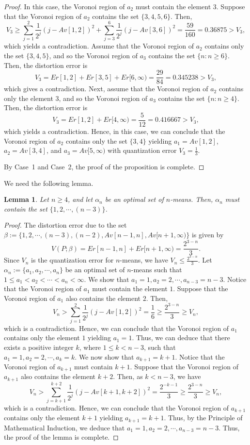 \documentclass[12pt, reqno]{amsart}
\theoremstyle{plain}
\newtheorem{lemma}[subsection]{Lemma}
\theoremstyle{definition}
\newcommand{\set}[1]{\{#1\}}%
\newcommand{\ga}{\alpha}
\newcommand{\gb}{\beta}
\begin{document}
\begin{proof}
In this case, the Voronoi region of $a_2$ must contain the element $3$. Suppose that the Voronoi region of $a_2$ contains the set $\set{3, 4, 5, 6}$. Then,
\[V_3\geq  \sum_{j=1}^2\frac 1 {2^j}(j-Av[1,2])^2+ \sum_{j=3}^6\frac 1 {2^j}(j-Av[3, 6])^2 =\frac{59}{160} =0.36875>V_3,\]
which yields a contradiction. Assume that the Voronoi region of $a_2$ contains only the set $\set{3, 4, 5}$, and so the Voronoi region of $a_3$ contains the set $\set{n : n\geq 6}$. Then, the distortion error is
\[V_3=Er[1,2]+Er[3,5]+Er[6, \infty)=\frac{29}{84} =0.345238>V_3,\]
which gives a contradiction.
Next, assume that the Voronoi region of $a_2$ contains only the element $3$, and so the Voronoi region of $a_3$ contains the set $\set{n : n\geq 4}$. Then, the distortion error is
\[V_3=Er[1,2]+Er[4, \infty)=\frac{5}{12}=0.416667>V_3,\]
which yields a contradiction.
Hence, in this case, we can conclude that the Voronoi region of $a_2$ contains only the set $\set{3,4}$ yielding $a_1=Av[1,2]$, $a_2=Av[3,4]$, and $a_3=Av[5, \infty)$ with quantization error $V_3=\frac 13$.

By Case~1 and Case~2, the proof of the proposition is complete.
\end{proof}

We need the following lemma.

\begin{lemma} \label{lemma1}
Let $n\geq 4$, and let $\ga_n$ be an optimal set of $n$-means. Then, $\ga_n$ must contain the set $\set{1, 2, \cdots, (n-3)}$.
\end{lemma}
\begin{proof}
The distortion error due to the set $\gb:=\set{1, 2, \cdots, (n-3), (n-2), Av[n-1, n], Av[n+1, \infty)}$ is given by
\[V(P; \gb)=Er[n-1, n]+Er[n+1, \infty)=\frac{2^{3-n}}{3}.\]
Since $V_n$ is the quantization error for $n$-means, we have $V_n\leq \frac{2^{3-n}}{3}$.
Let $\ga_n:=\set{a_1, a_2, \cdots, a_n}$ be an optimal set of $n$-means such that $1\leq a_1<a_2<\cdots<a_n<\infty$. We show that $a_1=1, a_2=2, \cdots, a_{n-3}=n-3$.
Notice that the Voronoi region of $a_1$ must contain the element $1$. Suppose that the Voronoi region of $a_1$ also contains the element $2$. Then,
\[V_n>\sum_{j=1}^2\frac 1 {2^j}(j-Av[1,2])^2=\frac{1}{6}\geq \frac{2^{3-n}}{3} \geq V_n,\]
which is a contradiction. Hence, we can conclude that the Voronoi region of $a_1$ contains only the element $1$ yielding $a_1=1$. Thus, we can deduce that there exists a positive integer $k$, where $1\leq k<n-3$, such that $a_1=1, a_2=2, \cdots, a_k=k$.
We now show that $a_{k+1}=k+1$. Notice that the Voronoi region of $a_{k+1}$ must contain $k+1$. Suppose that the Voronoi region of $a_{k+1}$ also contains the element $k+2$. Then, as $k<n-3$, we have
\[V_n>\sum_{j=k+1}^{k+2}\frac 1 {2^j}(j-Av[k+1, k+2])^2=\frac{2^{-k-1}}{3}\geq \frac{2^{3-n}}{3}\geq V_n,\]
which is a contradiction. Hence, we can conclude that the Voronoi region of $a_{k+1}$ contains only the element $k+1$ yielding $a_{k+1}=k+1$. Thus, by the Principle of Mathematical Induction, we deduce that  $a_1=1, a_2=2, \cdots, a_{n-3}=n-3$. Thus, the proof of the lemma is complete.
\end{proof}
\end{document}
